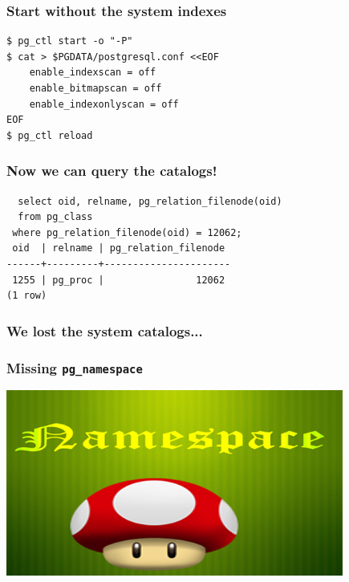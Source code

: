 \documentclass{beamer}
\begin{document}
\begin{frame}[fragile]
  \frametitle{Start without the system indexes}
  
  \vfill

  \begin{verbatim}
$ pg_ctl start -o "-P"
$ cat > $PGDATA/postgresql.conf <<EOF
	enable_indexscan = off
	enable_bitmapscan = off
	enable_indexonlyscan = off
EOF
$ pg_ctl reload
  \end{verbatim}  
\end{frame}

\begin{frame}[fragile]
  \frametitle{Now we can query the catalogs!}
  
  \vfill

  \begin{verbatim}
  select oid, relname, pg_relation_filenode(oid)
  from pg_class
 where pg_relation_filenode(oid) = 12062;
 oid  | relname | pg_relation_filenode 
------+---------+----------------------
 1255 | pg_proc |                12062
(1 row)
  \end{verbatim}
\end{frame}

\begin{frame}[fragile]
  \frametitle{We lost the system catalogs...}

  \vfill
\end{frame}


\begin{frame}[fragile]
  \frametitle{Missing \texttt{pg\_namespace}}

  \vfill
  
  \begin{center}
    \includegraphics[height=2.4in]{namespace1.png}
  \end{center}
\end{frame}
\end{document}
